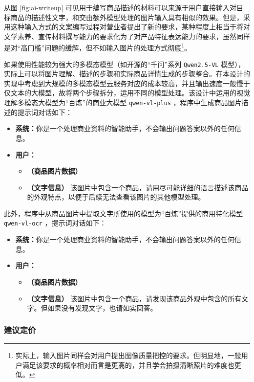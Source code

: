 从图 \ref{fig:ai-writeup} 可见用于编写商品描述的材料可以来源于用户直接输入对目标商品的描述性文字，和交由额外模型处理的图片输入具有相似的效果。但是，采用这种输入方式的文案编写过程对营业者提出了新的要求，某种程度上相当于将对文学素养、宣传材料撰写能力的要求化为了对产品特征表达能力的要求，虽然同样是对“高门槛”问题的缓解，但不如输入图片的处理方式彻底\footnote{实际上，输入图片同样会对用户提出图像质量把控的要求。但明显地，一般用户满足该要求的概率相对而言是更高的，并且学会拍摄清晰照片的难度也更低。}。

如果使用性能较为强大的多模态模型（如开源的“千问”系列 \verb|Qwen2.5-VL| 模型），实际上可以将图片理解、描述的步骤和实际商品详情生成的步骤整合。在本设计的实现中考虑到大规模的多模态模型云服务对应的成本较高，并且输出速度一般慢于仅文本的大模型，故将两个步骤拆分，运用不同的模型处理。该设计中运用的视觉理解多模态大模型为“百炼”的商业大模型 \verb|qwen-vl-plus| ，程序中生成商品图片描述的提示词对话如下：

\begin{itemize}
    \item[] \textbf{系统：}你是一个处理商业资料的智能助手，不会输出问题答案以外的任何信息。
    \item[] \textbf{用户：}
    \begin{itemize}
        \item[] \textbf{（商品图片数据）}
        \item[] \textbf{（文字信息）} 该图片中包含一个商品，请用尽可能详细的语言描述该商品的外观特点，以便于后续无法查看该图片的其他模型处理。
    \end{itemize}
\end{itemize}

此外，程序中从商品图片中提取文字所使用的模型为“百炼”提供的商用特化模型 \verb|qwen-vl-ocr| ，提示词对话如下：

\begin{itemize}
    \item[] \textbf{系统：}你是一个处理商业资料的智能助手，不会输出问题答案以外的任何信息。
    \item[] \textbf{用户：}
    \begin{itemize}
        \item[] \textbf{（商品图片数据）}
        \item[] \textbf{（文字信息）} 该图片中包含一个商品，请发现该商品外观中包含的所有文字。但如果没有发现文字，也请如实回答。
    \end{itemize}
\end{itemize}

\subsubsection{建议定价}

